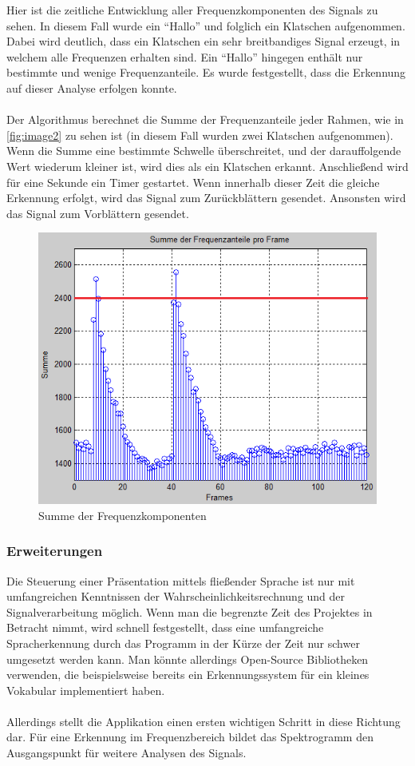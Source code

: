 Hier ist die zeitliche Entwicklung aller Frequenzkomponenten des Signals zu sehen. In diesem Fall wurde ein "`Hallo"' und folglich ein Klatschen aufgenommen. Dabei wird deutlich, dass ein Klatschen ein sehr breitbandiges Signal erzeugt, in welchem alle Frequenzen erhalten sind. Ein "`Hallo"' hingegen enthält nur bestimmte und wenige Frequenzanteile. Es wurde festgestellt, dass die Erkennung auf dieser Analyse erfolgen konnte. \\
\\
Der Algorithmus berechnet die Summe der Frequenzanteile jeder Rahmen, wie in \autoref{fig:image2} zu sehen ist (in diesem Fall wurden zwei Klatschen aufgenommen). Wenn die Summe eine bestimmte Schwelle überschreitet, und der darauffolgende Wert wiederum kleiner ist, wird dies als ein Klatschen erkannt. Anschließend wird für eine Sekunde ein Timer gestartet. Wenn innerhalb dieser Zeit die gleiche Erkennung erfolgt, wird das Signal zum Zurückblättern gesendet. Ansonsten wird das Signal zum Vorblättern gesendet.

\begin{figure}[H]
	\centering
	\includegraphics[angle=0,width=14cm]{beatcontrol/BeatBilder/bild2.png}
	\caption{Summe der Frequenzkomponenten}
	\label{fig:image2}
\end{figure}

\subsubsection{Erweiterungen}
Die Steuerung einer Präsentation mittels fließender Sprache ist nur mit umfangreichen Kenntnissen der Wahrscheinlichkeitsrechnung und der Signalverarbeitung möglich. Wenn man die begrenzte Zeit des Projektes in Betracht nimmt, wird schnell festgestellt, dass  eine umfangreiche Spracherkennung durch das Programm in der Kürze der Zeit nur schwer umgesetzt werden kann. Man könnte allerdings Open-Source Bibliotheken verwenden, die beispielsweise bereits ein Erkennungssystem für ein kleines Vokabular implementiert haben.\\
\\
Allerdings stellt die Applikation einen ersten wichtigen Schritt in diese Richtung dar. Für eine Erkennung im Frequenzbereich bildet das Spektrogramm den Ausgangspunkt für weitere Analysen des Signals. 


